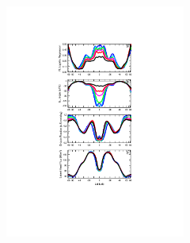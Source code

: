 \begin{figure}[t]
\begin{center}
\noindent\includegraphics[width=14pc,angle=0]{chapter6/temp_zonal_4reg_dwn.pdf}\\
\end{center}
\caption{}
\label{fig:4reg}
\end{figure}

